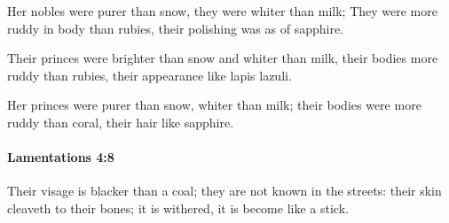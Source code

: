 			\begin{versebox}
					\item[BHS] 
					\item[LXX] 
					\item[ASV] Her nobles were purer than snow, they were whiter than milk; They were more ruddy in body than rubies, their polishing was as of sapphire.
					\item[NIV] Their princes were brighter than snow and whiter than milk, their bodies more ruddy than rubies, their appearance like lapis lazuli.
					\item[NRSV] Her princes were purer than snow, whiter than milk; their bodies were more ruddy than coral, their hair like sapphire.
			\end{versebox}

		\paragraph{Lamentations 4:8} %
			\label{LAMENTATIONS-4-8}

			Their visage is blacker than a coal; they are not known in the streets: their skin cleaveth to their bones; it is withered, it is become like a stick.

